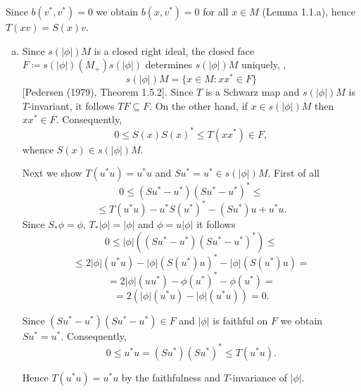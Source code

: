 Since $b(v^{*},v^{*}) = 0$ we obtain $b(x,v^{*}) = 0$ for all $x \in M$ (Lemma 1.1.a), hence $T(xv) = S(x)v$.

\begin{enumerate}[(a)]
\item 
Since $s(|\phi|)M$ is a closed right ideal, the closed face $F \coloneqq s(|\phi|)(M_{+})s(|\phi|)$ determines $s(|\phi|)M$ uniquely, \ie,
\[
s(|\phi|)M = \{x \in M \colon xx^{*} \in F\}
\]
[Pedersen (1979), Theorem 1.5.2].
Since $T$ is a Schwarz map and $s(|\phi|)M$ is $T$-invariant, it follows $TF \subseteq F$.
On the other hand, if $x \in s(|\phi|)M$ then $xx^{*} \in F$.
Consequently,
\[
0 \leq S(x)S(x)^{*} \leq T(xx^{*}) \in F,
\]
whence $S(x) \in s(|\phi|)M$.

Next we show $T(u^{*}u) = u^{*}u$ and $Su^{*} = u^{*} \in s(|\phi|)M$.
First of all
\[
0 \leq (Su^{*} - u^{*})(Su^{*} - u^{*})^{*} \leq
\]
\[
\leq T(u^{*}u) - u^{*}S(u^{*})^{*} - (Su^{*})u + u^{*}u.
\]
Since $S_{*}\phi = \phi$, $T_{*}|\phi| = |\phi|$ and $\phi = u|\phi|$ it follows
\[
0 \leq |\phi|((Su^{*} - u^{*})(Su^{*} - u^{*})^{*}) \leq
\]
\[
\leq 2|\phi|(u^{*}u) - |\phi|(S(u^{*})u)^{*} - |\phi|(S(u^{*})u) =
\]
\[
= 2|\phi|(uu^{*}) - \phi(u^{*})^{*} - \phi(u^{*}) =
\]
\[
= 2(|\phi|(u^{*}u) - |\phi|(u^{*}u)) = 0.
\]

Since $(Su^{*} - u^{*})(Su^{*} - u^{*}) \in F$ and $|\phi|$ is faithful on $F$ we obtain $Su^{*} = u^{*}$.
Consequently,
\[
0 \leq u^{*}u = (Su^{*})(Su^{*})^{*} \leq T(u^{*}u).
\]

Hence $T(u^{*}u) = u^{*}u$ by the faithfulness and $T$-invariance of $|\phi|$.
\end{enumerate}


